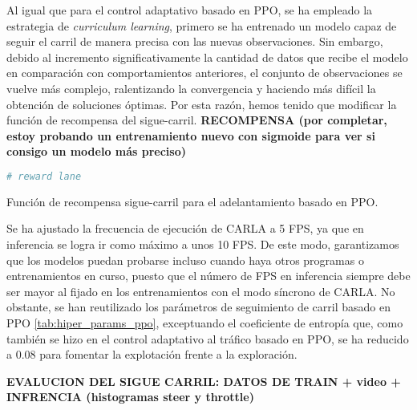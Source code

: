 Al igual que para el control adaptativo basado en \ac{PPO}, se ha empleado la estrategia de \textit{curriculum learning}, primero se ha entrenado un modelo capaz de seguir el carril de manera precisa con las nuevas observaciones. Sin embargo, debido al incremento significativamente la cantidad de datos que recibe el modelo en comparación con comportamientos anteriores, el conjunto de observaciones se vuelve más complejo, ralentizando la convergencia y haciendo más difícil la obtención de soluciones óptimas. Por esta razón, hemos tenido que modificar la función de recompensa del sigue-carril. \textbf{ RECOMPENSA (por completar, estoy probando un entrenamiento nuevo con sigmoide para ver si consigo un modelo más preciso)}
\begin{code}[h]
\begin{lstlisting}[language=Python]
# reward lane
\end{lstlisting}
\caption[Función de recompensa sigue-carril para el adelantamiento basado en \ac{PPO}]{Función de recompensa sigue-carril para el adelantamiento basado en \ac{PPO}.}
\label{cod:rew_ppo_lane_overtaken}
\end{code}

Se ha ajustado la frecuencia de ejecución de CARLA a 5 \ac{FPS}, ya que en inferencia se logra ir como máximo a unos 10 \ac{FPS}. De este modo, garantizamos que los modelos puedan probarse incluso cuando haya otros programas o entrenamientos en curso, puesto que el número de \ac{FPS} en inferencia siempre debe ser mayor al fijado en los entrenamientos con el modo síncrono de CARLA. No obstante, se han reutilizado los parámetros de seguimiento de carril basado en \ac{PPO} \ref{tab:hiper_params_ppo}, exceptuando el coeficiente de entropía que, como también se hizo en el control adaptativo al tráfico basado en \ac{PPO}, se ha reducido a 0.08 para fomentar la explotación frente a la exploración.

\textbf{EVALUCION DEL SIGUE CARRIL: DATOS DE TRAIN + video + INFRENCIA (histogramas steer y throttle)}

